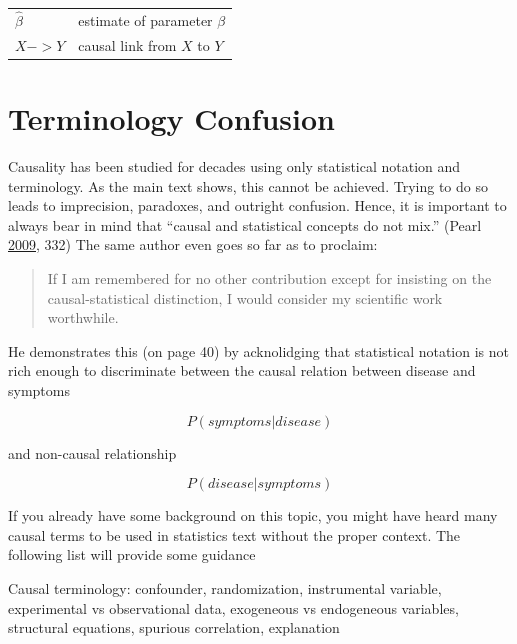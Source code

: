 \documentclass[
]{book}
\theoremstyle{definition}
\theoremstyle{definition}
\theoremstyle{definition}
\theoremstyle{remark}
\begin{document}
\begin{longtable}[]{@{}ll@{}}
\begin{minipage}[t]{0.47\columnwidth}
\(\hat{\beta}\)\strut
\end{minipage} & \begin{minipage}[t]{0.47\columnwidth}\raggedright
estimate of parameter \(\beta\)\strut
\end{minipage}\tabularnewline
\begin{minipage}[t]{0.47\columnwidth}\raggedright
\(X -> Y\)\strut
\end{minipage} & \begin{minipage}[t]{0.47\columnwidth}\raggedright
causal link from \(X\) to \(Y\)\strut
\end{minipage}\tabularnewline
\bottomrule
\end{longtable}

\hypertarget{terminology-confusion}{%
\section{Terminology Confusion}\label{terminology-confusion}}

Causality has been studied for decades using only statistical notation and terminology. As the main text shows, this cannot be achieved. Trying to do so leads to imprecision, paradoxes, and outright confusion. Hence, it is important to always bear in mind that ``causal and statistical concepts do not mix.'' (Pearl \protect\hyperlink{ref-pearl2009}{2009}, 332) The same author even goes so far as to proclaim:

\begin{quote}
If I am remembered for no other contribution except for insisting on the causal-statistical distinction, I would consider my scientific work worthwhile.
\end{quote}

He demonstrates this (on page 40) by acknolidging that statistical notation is not rich enough to discriminate between the causal relation between disease and symptoms

\[
P(symptoms | disease)
\]

and non-causal relationship

\[
P(disease | symptoms)
\]

If you already have some background on this topic, you might have heard many causal terms to be used in statistics text without the proper context. The following list will provide some guidance

Causal terminology:
confounder, randomization, instrumental variable, experimental vs observational data, exogeneous vs endogeneous variables, structural equations, spurious correlation, explanation
\end{document}
